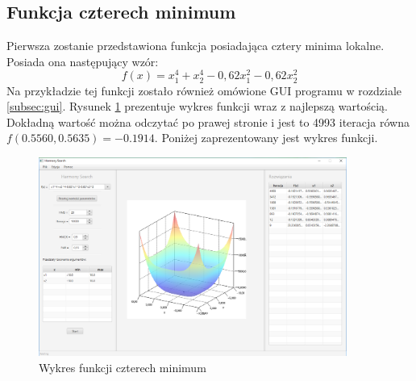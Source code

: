 \documentclass[10pt, a4paper]{article}
\begin{document}
\subsection{Funkcja czterech minimum}
\label{subsec:fcn4min}
Pierwsza zostanie przedstawiona funkcja posiadająca cztery minima lokalne. Posiada ona następujący wzór: $$f(x) = x_{1}^{4}+x_{2}^{4}-0,62x_{1}^{2}-0,62x_{2}^{2} $$ Na przykładzie tej funkcji zostało również omówione GUI programu w rozdziale \ref{subsec:gui}. Rysunek \ref{fig:4} prezentuje wykres funkcji wraz z najlepszą wartością. Dokładną wartość można odczytać po prawej stronie i jest to 4993 iteracja równa $f(0.5560,0.5635) = -0.1914$. Poniżej zaprezentowany jest wykres funkcji. 
\begin{figure}[htbp]
	\centering
		\includegraphics[width=0.90\textwidth]{images/3.PNG}
		\caption{Wykres funkcji czterech minimum}
		\label{fig:4}
\end{figure}
\end{document}

